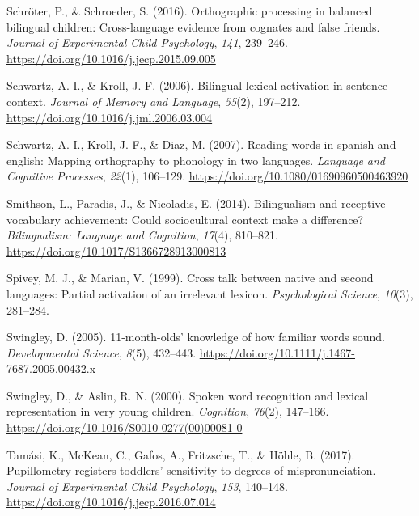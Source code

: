 \documentclass[
  man,
  floatsintext,
  colorlinks=true,linkcolor=blue,citecolor=blue,urlcolor=blue,biblatex]{apa7}
\newlength{\cslhangindent}
\newlength{\cslentryspacingunit} %
\newenvironment{CSLReferences}[2] %
 {%
  \setlength{\parindent}{0pt}
  \ifodd #1
  \let\oldpar\par
  \def\par{\hangindent=\cslhangindent\oldpar}
  \fi
  \setlength{\parskip}{#2\cslentryspacingunit}
 }%
 {}
\begin{document}
\begin{CSLReferences}{1}{0}
\leavevmode{}%
Schröter, P., \& Schroeder, S. (2016). Orthographic processing in
balanced bilingual children: Cross-language evidence from cognates and
false friends. \emph{Journal of Experimental Child Psychology},
\emph{141}, 239--246. \url{https://doi.org/10.1016/j.jecp.2015.09.005}

\leavevmode{}%
Schwartz, A. I., \& Kroll, J. F. (2006). Bilingual lexical activation in
sentence context. \emph{Journal of Memory and Language}, \emph{55}(2),
197--212. \url{https://doi.org/10.1016/j.jml.2006.03.004}

\leavevmode{}%
Schwartz, A. I., Kroll, J. F., \& Diaz, M. (2007). Reading words in
spanish and english: Mapping orthography to phonology in two languages.
\emph{Language and Cognitive Processes}, \emph{22}(1), 106--129.
\url{https://doi.org/10.1080/01690960500463920}

\leavevmode{}%
Smithson, L., Paradis, J., \& Nicoladis, E. (2014). Bilingualism and
receptive vocabulary achievement: Could sociocultural context make a
difference? \emph{Bilingualism: Language and Cognition}, \emph{17}(4),
810--821. \url{https://doi.org/10.1017/S1366728913000813}

\leavevmode{}%
Spivey, M. J., \& Marian, V. (1999). Cross talk between native and
second languages: Partial activation of an irrelevant lexicon.
\emph{Psychological Science}, \emph{10}(3), 281--284.

\leavevmode{}%
Swingley, D. (2005). 11-month-olds' knowledge of how familiar words
sound. \emph{Developmental Science}, \emph{8}(5), 432--443.
\url{https://doi.org/10.1111/j.1467-7687.2005.00432.x}

\leavevmode{}%
Swingley, D., \& Aslin, R. N. (2000). Spoken word recognition and
lexical representation in very young children. \emph{Cognition},
\emph{76}(2), 147--166.
\url{https://doi.org/10.1016/S0010-0277(00)00081-0}

\leavevmode{}%
Tamási, K., McKean, C., Gafos, A., Fritzsche, T., \& Höhle, B. (2017).
Pupillometry registers toddlers' sensitivity to degrees of
mispronunciation. \emph{Journal of Experimental Child Psychology},
\emph{153}, 140--148. \url{https://doi.org/10.1016/j.jecp.2016.07.014}


\end{CSLReferences}
\end{document}

